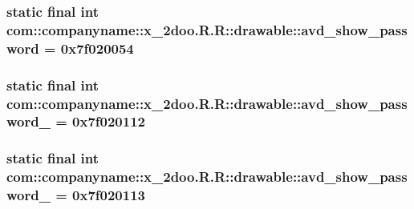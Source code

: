\hypertarget{classcom_1_1companyname_1_1x__2doo_1_1_r_1_1drawable_caf3c399bd13faaf6d4926e3e51c9176}{
\subsubsection[{avd\_\-show\_\-password}]{\setlength{\rightskip}{0pt plus 5cm}static final int com::companyname::x\_\-2doo.R.R::drawable::avd\_\-show\_\-password = 0x7f020054}}
\label{classcom_1_1companyname_1_1x__2doo_1_1_r_1_1drawable_caf3c399bd13faaf6d4926e3e51c9176}


\hypertarget{classcom_1_1companyname_1_1x__2doo_1_1_r_1_1drawable_373c6d00ad11289c3cf7affd726d8460}{
\subsubsection[{avd\_\-show\_\-password\_\-1}]{\setlength{\rightskip}{0pt plus 5cm}static final int com::companyname::x\_\-2doo.R.R::drawable::avd\_\-show\_\-password\_ = 0x7f020112}}
\label{classcom_1_1companyname_1_1x__2doo_1_1_r_1_1drawable_373c6d00ad11289c3cf7affd726d8460}


\hypertarget{classcom_1_1companyname_1_1x__2doo_1_1_r_1_1drawable_e019ba45b5ea623c9d173b19322ba3f5}{
\subsubsection[{avd\_\-show\_\-password\_\-2}]{\setlength{\rightskip}{0pt plus 5cm}static final int com::companyname::x\_\-2doo.R.R::drawable::avd\_\-show\_\-password\_ = 0x7f020113}}
\label{classcom_1_1companyname_1_1x__2doo_1_1_r_1_1drawable_e019ba45b5ea623c9d173b19322ba3f5}


